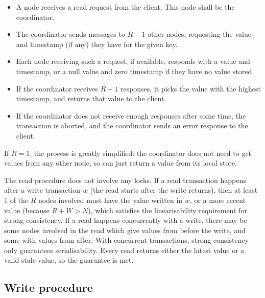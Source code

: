 \documentclass[12pt,a4paper,twoside,openany]{report}
\begin{document}
\begin{itemize}
\item
A node receives a read request from the client. This node shall be the coordinator.

\item
The coordinator sends messages to $R - 1$ other nodes, requesting the value and timestamp (if any) they have for the given key.

\item
Each node receiving such a request, if available, responds with a value and timestamp, or a null value and zero timestamp if they have no value stored.

\item
If the coordinator receives $R - 1$ responses, it picks the value with the highest timestamp, and returns that value to the client.

\item
If the coordinator does not receive enough responses after some time, the transaction is aborted, and the coordinator sends an error response to the client.

\end{itemize}

If $R = 1$, the process is greatly simplified: the coordinator does not need to get values from any other node, so can just return a value from its local store.

The read procedure does not involve any locks. If a read transaction happens after a write transaction $w$ (the read starts after the write returns), then at least 1 of the $R$ nodes involved must have the value written in $w$, or a more recent value (because $R + W > N$), which satisfies the linearisability requirement for strong consistency. If a read happens concurrently with a write, there may be some nodes involved in the read which give values from before the write, and some with values from after. With concurrent transactions, strong consistency only guarantees serialisability. Every read returns either the latest value or a valid stale value, so the guarantee is met.

\subsection{Write procedure}
\end{document}
